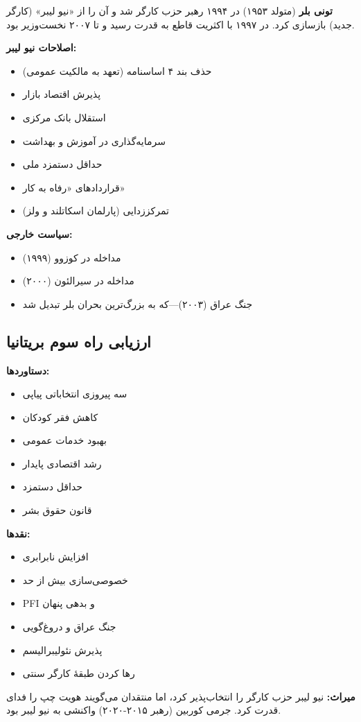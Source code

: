 \textbf{تونی بلر} (متولد ۱۹۵۳) در ۱۹۹۴ رهبر حزب کارگر شد و آن را از «نیو لیبر» (کارگر جدید) بازسازی کرد. در ۱۹۹۷ با اکثریت قاطع به قدرت رسید و تا ۲۰۰۷ نخست‌وزیر بود.

\textbf{اصلاحات نیو لیبر:}
\begin{itemize}
    \item حذف بند ۴ اساسنامه (تعهد به مالکیت عمومی)
    \item پذیرش اقتصاد بازار
    \item استقلال بانک مرکزی
    \item سرمایه‌گذاری در آموزش و بهداشت
    \item حداقل دستمزد ملی
    \item قراردادهای «رفاه به کار»
    \item تمرکززدایی (پارلمان اسکاتلند و ولز)
\end{itemize}

\textbf{سیاست خارجی:}
\begin{itemize}
    \item مداخله در کوزوو (۱۹۹۹)
    \item مداخله در سیرالئون (۲۰۰۰)
    \item جنگ عراق (۲۰۰۳)—که به بزرگ‌ترین بحران بلر تبدیل شد
\end{itemize}


\subsection{ارزیابی راه سوم بریتانیا}

\begin{tcolorbox}[
    enhanced,
    colback=leftred!8,
    colframe=leftred,
    boxrule=1.5pt,
    arc=5pt,
    fonttitle=\bfseries,
    title={\rl{🔴 مناظره: راه سوم - موفقیت یا خیانت؟}}
]

\textbf{دستاوردها:}
\begin{itemize}
    \item سه پیروزی انتخاباتی پیاپی
    \item کاهش فقر کودکان
    \item بهبود خدمات عمومی
    \item رشد اقتصادی پایدار
    \item حداقل دستمزد
    \item قانون حقوق بشر
\end{itemize}



\textbf{نقدها:}
\begin{itemize}
    \item افزایش نابرابری
    \item خصوصی‌سازی بیش از حد
    \item PFI و بدهی پنهان
    \item جنگ عراق و دروغ‌گویی
    \item پذیرش نئولیبرالیسم
    \item رها کردن طبقهٔ کارگر سنتی
\end{itemize}


\vspace{3mm}
\textbf{میراث:}
نیو لیبر حزب کارگر را انتخاب‌پذیر کرد، اما منتقدان می‌گویند هویت چپ را فدای قدرت کرد. جرمی کوربین (رهبر ۲۰۱۵-۲۰۲۰) واکنشی به نیو لیبر بود.
\end{tcolorbox}

